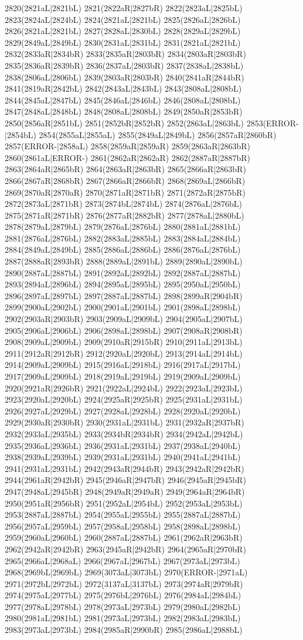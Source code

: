 2820(2821aL|2821bL) 2821(2822aR|2827bR) 2822(2823aL|2825bL) 2823(2824aL|2824bL) 2824(2821aL|2821bL) 2825(2826aL|2826bL) 2826(2821aL|2821bL) 2827(2828aL|2830bL) 2828(2829aL|2829bL) 2829(2849aL|2849bL) 2830(2831aL|2831bL) 2831(2821aL|2821bL) 2832(2833aR|2834bR) 2833(2835aR|2803bR) 2834(2803aR|2803bR) 2835(2836aR|2839bR) 2836(2837aL|2803bR) 2837(2838aL|2838bL) 2838(2806aL|2806bL) 2839(2803aR|2803bR) 2840(2841aR|2844bR) 2841(2819aR|2842bL) 2842(2843aL|2843bL) 2843(2808aL|2808bL) 2844(2845aL|2847bL) 2845(2846aL|2846bL) 2846(2808aL|2808bL) 2847(2848aL|2848bL) 2848(2808aL|2808bL) 2849(2850aR|2853bR) 2850(2856aR|2851bL) 2851(2852bR|2852bR) 2852(2863aL|2863bL) 2853(ERROR-|2854bL) 2854(2855aL|2855aL) 2855(2849aL|2849bL) 2856(2857aR|2860bR) 2857(ERROR-|2858aL) 2858(2859aR|2859aR) 2859(2863aR|2863bR) 2860(2861aL|ERROR-) 2861(2862aR|2862aR) 2862(2887aR|2887bR) 2863(2864aR|2865bR) 2864(2863aR|2863bR) 2865(2866aR|2863bR) 2866(2867aR|2868bR) 2867(2866aR|2866bR) 2868(2869aL|2866bR) 2869(2870aR|2870aR) 2870(2871aR|2871bR) 2871(2872aR|2875bR) 2872(2873aL|2871bR) 2873(2874bL|2874bL) 2874(2876aL|2876bL) 2875(2871aR|2871bR) 2876(2877aR|2882bR) 2877(2878aL|2880bL) 2878(2879aL|2879bL) 2879(2876aL|2876bL) 2880(2881aL|2881bL) 2881(2876aL|2876bL) 2882(2883aL|2885bL) 2883(2884aL|2884bL) 2884(2849aL|2849bL) 2885(2886aL|2886bL) 2886(2876aL|2876bL) 2887(2888aR|2893bR) 2888(2889aL|2891bL) 2889(2890aL|2890bL) 2890(2887aL|2887bL) 2891(2892aL|2892bL) 2892(2887aL|2887bL) 2893(2894aL|2896bL) 2894(2895aL|2895bL) 2895(2950aL|2950bL) 2896(2897aL|2897bL) 2897(2887aL|2887bL) 2898(2899aR|2904bR) 2899(2900aL|2902bL) 2900(2901aL|2901bL) 2901(2898aL|2898bL) 2902(2903aR|2903bR) 2903(2909aL|2909bL) 2904(2905aL|2907bL) 2905(2906aL|2906bL) 2906(2898aL|2898bL) 2907(2908aR|2908bR) 2908(2909aL|2909bL) 2909(2910aR|2915bR) 2910(2911aL|2913bL) 2911(2912aR|2912bR) 2912(2920aL|2920bL) 2913(2914aL|2914bL) 2914(2909aL|2909bL) 2915(2916aL|2918bL) 2916(2917aL|2917bL) 2917(2909aL|2909bL) 2918(2919aL|2919bL) 2919(2909aL|2909bL) 2920(2921aR|2926bR) 2921(2922aL|2924bL) 2922(2923aL|2923bL) 2923(2920aL|2920bL) 2924(2925aR|2925bR) 2925(2931aL|2931bL) 2926(2927aL|2929bL) 2927(2928aL|2928bL) 2928(2920aL|2920bL) 2929(2930aR|2930bR) 2930(2931aL|2931bL) 2931(2932aR|2937bR) 2932(2933aL|2935bL) 2933(2934bR|2934bR) 2934(2942aL|2942bL) 2935(2936aL|2936bL) 2936(2931aL|2931bL) 2937(2938aL|2940bL) 2938(2939aL|2939bL) 2939(2931aL|2931bL) 2940(2941aL|2941bL) 2941(2931aL|2931bL) 2942(2943aR|2944bR) 2943(2942aR|2942bR) 2944(2961aR|2942bR) 2945(2946aR|2947bR) 2946(2945aR|2945bR) 2947(2948aL|2945bR) 2948(2949aR|2949aR) 2949(2964aR|2964bR) 2950(2951aR|2956bR) 2951(2952aL|2954bL) 2952(2953aL|2953bL) 2953(2887aL|2887bL) 2954(2955aL|2955bL) 2955(2887aL|2887bL) 2956(2957aL|2959bL) 2957(2958aL|2958bL) 2958(2898aL|2898bL) 2959(2960aL|2960bL) 2960(2887aL|2887bL) 2961(2962aR|2963bR) 2962(2942aR|2942bR) 2963(2945aR|2942bR) 2964(2965aR|2970bR) 2965(2966aL|2968aL) 2966(2967aL|2967bL) 2967(2973aL|2973bL) 2968(2969bL|2969bL) 2969(3073aL|3073bL) 2970(ERROR-|2971aL) 2971(2972bL|2972bL) 2972(3137aL|3137bL) 2973(2974aR|2979bR) 2974(2975aL|2977bL) 2975(2976bL|2976bL) 2976(2984aL|2984bL) 2977(2978aL|2978bL) 2978(2973aL|2973bL) 2979(2980aL|2982bL) 2980(2981aL|2981bL) 2981(2973aL|2973bL) 2982(2983aL|2983bL) 2983(2973aL|2973bL) 2984(2985aR|2990bR) 2985(2986aL|2988bL) 